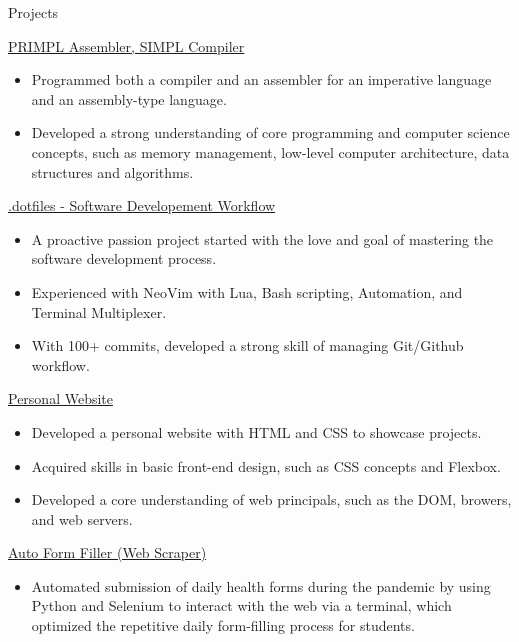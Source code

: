 \documentclass{article}
\newlength{\tabin}
\newlength{\secsep}
\newcommand{\lineunder}{\vspace*{-8pt} \\ \hspace*{-6pt} \hrulefill \\ \vspace*{-15pt}}
\newenvironment{tabbedsection}[1]{
  \begin{list}{}{
      \setlength{\itemsep}{0pt}
      \setlength{\labelsep}{0pt}
      \setlength{\labelwidth}{0pt}
      \setlength{\leftmargin}{\tabin}
      \setlength{\rightmargin}{\tabin}
      \setlength{\listparindent}{0pt}
      \setlength{\parsep}{0pt}
      \setlength{\parskip}{0pt}
      \setlength{\partopsep}{0pt}
      \setlength{\topsep}{#1}
    }
  \item[]
}{\end{list}}
\newenvironment{resume_section}[1]{
  \filbreak
  \vspace{2\secsep}
  \textsc{\large#1}
  \lineunder
  \begin{tabbedsection}{\secsep}
}{\end{tabbedsection}}
\newenvironment{resume_subsection}[2][]{
  \textbf{#2} \hfill {\footnotesize #1} \hspace{-5.1em}
  \begin{tabbedsection}{0.5\secsep}
}{\end{tabbedsection}}
\newenvironment{subitems}{
  \renewcommand{\labelitemi}{-}
  \begin{itemize}
      \setlength{\labelsep}{1em}
}{\end{itemize}}
\begin{document}
\begin{resume_section}{Projects}
  \begin{resume_subsection}[]{\href{}{PRIMPL Assembler, SIMPL Compiler}}
   \begin{subitems}
     \item Programmed both a compiler and an assembler for an imperative language and an assembly-type language.
     \item Developed a strong understanding of core programming and computer science concepts, such as memory management,
           low-level computer architecture, data structures and algorithms.
    \end{subitems}
  \end{resume_subsection}

  \begin{resume_subsection}[]{\href{https://github.com/TwinkletoesZen/.dotfiles}{.dotfiles - Software Developement Workflow \faGithub}}
    \begin{subitems}
      \item A proactive passion project started with the love and goal of mastering the software development process.
      \item Experienced with NeoVim with Lua, Bash scripting, Automation, and Terminal Multiplexer.
      \item With 100+ commits, developed a strong skill of managing Git/Github workflow.

    \end{subitems}
  \end{resume_subsection}

  \begin{resume_subsection}[]{\href{https://github.com/TwinkletoesZen/Personal-Website}{Personal Website \faGithub}}
    \begin{subitems}
      \item Developed a personal website with HTML and CSS to showcase projects.
      \item Acquired skills in basic front-end design, such as CSS concepts and Flexbox.
      \item Developed a core understanding of web principals, such as the DOM, browers, and web servers.
    \end{subitems}
  \end{resume_subsection}

  \begin{resume_subsection}[]{\href{https://github.com/TwinkletoesZen/Auto-HealthCheck-Completer}{Auto Form Filler (Web Scraper) \faGithub}}
    \begin{subitems}
      \item Automated submission of daily health forms during the pandemic by using Python and Selenium to interact with the web via a terminal, which optimized the repetitive daily form-filling process for students.
    \end{subitems}
  \end{resume_subsection}



\end{resume_section}
\end{document}
